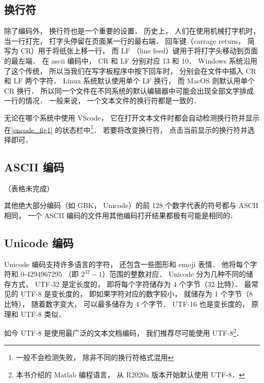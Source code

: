 \subsection{换行符}
除了编码外， 换行符也是一个重要的设置． 历史上， 人们在使用机械打字机时， 当一行打完， 打字头停留在页面某一行的最右端． 回车键（carrage return， 简写为 CR）用于将纸张上移一行， 而 LF （line feed）键用于将打字头移动到页面的最左端． 在 ascii 编码中， CR 和 LF 分别对应 13 和 10． Windows 系统沿用了这个传统， 所以当我们在写字板程序中按下回车时， 分别会在文件中插入 CR 和 LF 两个字符． Linux 系统默认使用单个 LF 换行， 而 MacOS 则默认用单个 CR 换行． 所以同一个文件在不同系统的默认编辑器中可能会出现全部文字排成一行的情况． 一般来说， 一个文本文件的换行符都是一致的．

无论在哪个系统中使用 VScode， 它在打开文本文件时都会自动检测换行符并显示在\autoref{encode_fig1} 的状态栏中\footnote{一般不会检测失败， 除非不同的换行符格式混用}． 若要将改变换行符， 点击当前显示的换行符并选择即可．

\subsection{ASCII 编码}
（表格未完成）

其他绝大部分编码（如 GBK， Unicode）的前 128 个数字代表的符号都与 ASCII 相同， 一个 ASCII 编码的文件用其他编码打开结果都极有可能是相同的．

\subsection{Unicode 编码}
Unicode 编码支持许多语言的字符， 还包含一些图形和 emoji 表情． 他将每个字符和 0-4294967295 （即 $2^{32}-1$）范围的整数对应． Unicode 分为几种不同的储存方式， UTF-32 是定长度的， 即将每个字符储存为 4 个字节（32 比特）． 最常见的 UTF-8 是变长度的， 即如果字符对应的数字较小， 就储存为 1 个字节（8 比特）， 随着数字变大， 可以最多储存为 4 个字节． UTF-16 也是变长度的， 原理和 UTF-8 类似．

如今 UTF-8 是使用最广泛的文本文档编码， 我们推荐尽可能使用 UTF-8\footnote{本书介绍的 Matlab 编程语言， 从 R2020a 版本开始默认使用 UTF-8．}．
